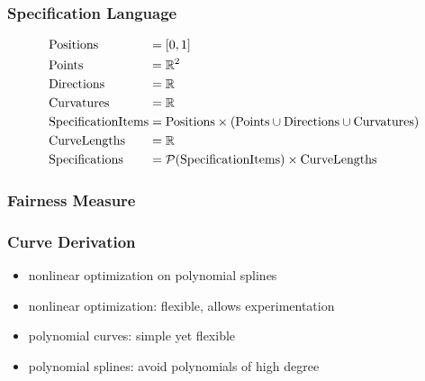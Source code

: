 \documentclass[mathserif]{beamer}
\begin{document}
		\begin{frame}
			\frametitle{Specification Language}
			\begin{equation*}
				\begin{alignedat}{2}
					& \mathrm{Positions}          && = \left[ 0,1 \right]\\
					& \mathrm{Points}             && = \mathbb{R}^{2}\\
					& \mathrm{Directions}         && = \mathbb{R}\\
					& \mathrm{Curvatures}         && = \mathbb{R}\\
					& \mathrm{SpecificationItems} && = \mathrm{Positions} \times \left(\mathrm{Points} \cup \mathrm{Directions} \cup \mathrm{Curvatures}\right)\\
					& \mathrm{CurveLengths}       && = \mathbb{R}\\
					& \mathrm{Specifications}     && = \mathcal{P}\!\left( \mathrm{SpecificationItems} \right) \times \mathrm{CurveLengths}
				\end{alignedat}
			\end{equation*}
		\end{frame}
		
		\begin{frame}
			\frametitle{Fairness Measure}
		\end{frame}
		
		\begin{frame}
			\frametitle{Curve Derivation}
			\begin{itemize}
				\item nonlinear optimization on polynomial splines %
				\item nonlinear optimization: flexible, allows experimentation
				\item polynomial curves: simple yet flexible %
				\item polynomial splines: avoid polynomials of high degree
			\end{itemize}
		\end{frame}
		
\end{document}
